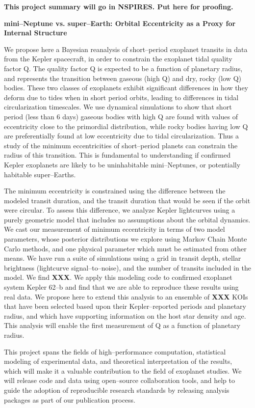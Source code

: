 {\bf This project summary will go in NSPIRES.  Put here for proofing.} \medskip 

\centerline{\bf mini--Neptune vs. super--Earth: Orbital Eccentricity as a Proxy for Internal Structure} \medskip

We propose here a Bayesian reanalysis of short--period exoplanet
transits in data from the Kepler spacecraft, in order to constrain the
exoplanet tidal quality factor Q.  The quality factor Q is expected to
be a function of planetary radius, and represents the transition
between gaseous (high Q) and dry, rocky (low Q) bodies.  These two
classes of exoplanets exhibit significant differences in how they
deform due to tides when in short period orbits, leading to
differences in tidal circularization timescales.  We use dynamical
simulations to show that short period (less than 6 days) gaseous
bodies with high Q are found with values of eccentricity close to the
primordial distribution, while rocky bodies having low Q are
preferentially found at low eccentricity due to tidal circularization.
Thus a study of the minimum eccentricities of short--period planets
can constrain the radius of this transition.  This is fundamental to
understanding if confirmed Kepler exoplanets are likely to be
uninhabitable mini--Neptunes, or potentially habitable super--Earths.

The minimum eccentricity is constrained using the difference between
the modeled transit duration, and the transit duration that would be
seen if the orbit were circular.  To assess this difference, we
analyze Kepler lightcurves using a purely geometric model that
includes no assumptions about the orbital dynamics.  We cast our
measurement of minimum eccentricity in terms of two model parameters,
whose posterior distributions we explore using Markov Chain Monte
Carlo methods, and one physical parameter which must be estimated from
other means.  We have run a suite of simulations using a grid in
transit depth, stellar brightness (lightcurve signal--to--noise), and
the number of transits included in the model.  We find {\bf XXX}.  We
apply this modeling code to confirmed exoplanet system Kepler 62--b
and find that we are able to reproduce these results using real data.
We propose here to extend this analysis to an ensemble of {\bf XXX}
KOIs that have been selected based upon their Kepler--reported periods
and planetary radius, and which have supporting information on the
host star density and age.  This analysis will enable the first
measurement of Q as a function of planetary radius.

This project spans the fields of high--performance computation,
statistical modeling of experimental data, and theoretical
interpretation of the results, which will make it a valuable
contribution to the field of exoplanet studies.  We will release code
and data using open--source collaboration tools, and help to guide the
adoption of reproducible research standards by releasing analysis
packages as part of our publication process.

